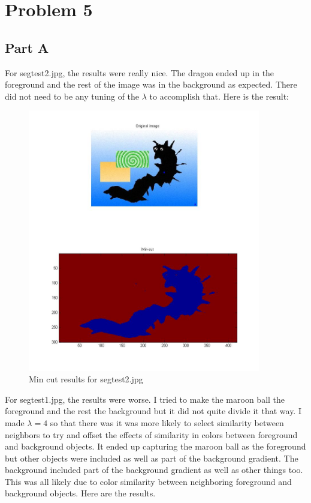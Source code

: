 \documentclass[11pt,psfig]{article}
\begin{document}
\newpage

\section*{Problem 5}

\subsection*{Part A}

For segtest2.jpg, the results were really nice. The dragon ended up in the foreground and the rest of the image was in the background as expected. There did not need to be any tuning of the $\lambda$ to accomplish that. Here is the result:

\begin{figure}[H]
\centering
\includegraphics[width=4in]{prob5plotA.jpg}
\caption{Min cut results for segtest2.jpg}
\end{figure}

For segtest1.jpg, the results were worse. I tried to make the maroon ball the foreground and the rest the background but it did not quite divide it that way. I made $\lambda=4$ so that there was it was more likely to select similarity between neighbors to try and offset the effects of similarity in colors between foreground and background objects. It ended up capturing the maroon ball as the foreground but other objects were included as well as part of the background gradient. The background included part of the background gradient as well as other things too. This was all likely due to color similarity between neighboring foreground and background objects. Here are the results.
\end{document}
